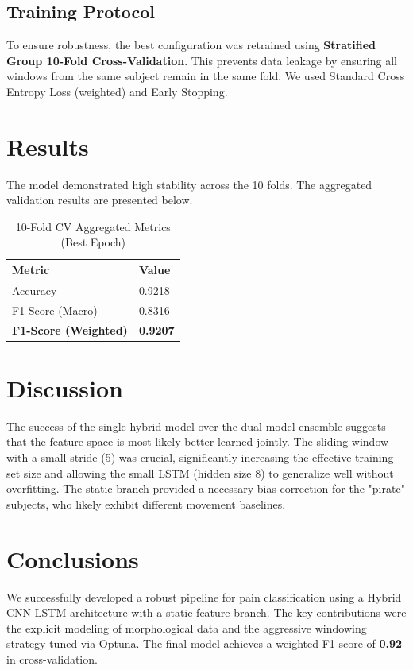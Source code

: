 \documentclass[11pt]{article}
\begin{document}
\begin{multicols}{2}
        
        \subsection{Training Protocol}
        To ensure robustness, the best configuration was retrained using \textbf{Stratified Group 10-Fold Cross-Validation}. This prevents data leakage by ensuring all windows from the same subject remain in the same fold. We used Standard Cross Entropy Loss (weighted) and Early Stopping.
        
        \section{Results}
        The model demonstrated high stability across the 10 folds. The aggregated validation results are presented below.
        
        \begin{table}[H]
            \centering
            \caption{10-Fold CV Aggregated Metrics (Best Epoch)}
            \begin{tabularx}{\linewidth}{lY}
                \toprule
                Metric & Value \\
                \midrule
                Accuracy & 0.9218 \\
                F1-Score (Macro) & 0.8316 \\
                \textbf{F1-Score (Weighted)} & \textbf{0.9207} \\
                \bottomrule
            \end{tabularx}
            \label{tab:Performance}
        \end{table}
        
        \section{Discussion}
        The success of the single hybrid model over the dual-model ensemble suggests that the feature space is most likely better learned jointly. The sliding window with a small stride (5) was crucial, significantly increasing the effective training set size and allowing the small LSTM (hidden size 8) to generalize well without overfitting. The static branch provided a necessary bias correction for the "pirate" subjects, who likely exhibit different movement baselines.
        
        \section{Conclusions}
        We successfully developed a robust pipeline for pain classification using a Hybrid CNN-LSTM architecture with a static feature branch. The key contributions were the explicit modeling of morphological data and the aggressive windowing strategy tuned via Optuna. The final model achieves a weighted F1-score of \textbf{0.92} in cross-validation.
        

\end{multicols}
\end{document}
